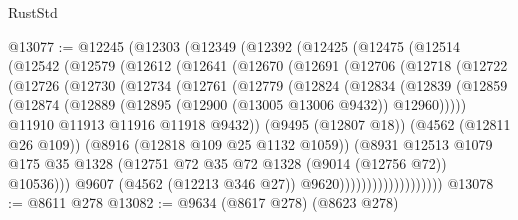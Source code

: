 \begin{lexlean}{RustStd}
\begin{coremodule}
@13077 := @12245
    (@12303
      (@12349
        (@12392
          (@12425
            (@12475
              (@12514
                (@12542
                  (@12579
                    (@12612
                      (@12641
                        (@12670
                          (@12691
                            (@12706
                              (@12718
                                (@12722
                                  (@12726
                                    (@12730
                                      (@12734
                                        (@12761
                                          (@12779
                                            (@12824
                                              (@12834
                                                (@12839
                                                  (@12859
                                                    (@12874
                                                      (@12889
                                                        (@12895
                                                          (@12900 (@13005 @13006 @9432))
                                                          @12960)))))
                                                @11910
                                                @11913
                                                @11916
                                                @11918
                                                @9432))
                                            (@9495 (@12807 @18))
                                            (@4562 (@12811 @26 @109))
                                            (@8916 (@12818 @109 @25 @1132 @1059))
                                            (@8931
                                              @12513
                                              @1079
                                              @175
                                              @35
                                              @1328
                                              (@12751
                                                @72
                                                @35
                                                @72
                                                @1328
                                                (@9014 (@12756 @72))
                                                @10536)))
                                          @9607
                                          (@4562 (@12213 @346 @27))
                                          @9620)))))))))))))))))))
@13078 := @8611 @278
@13082 := @9634 (@8617 @278) (@8623 @278)

\end{coremodule}
\end{lexlean}
